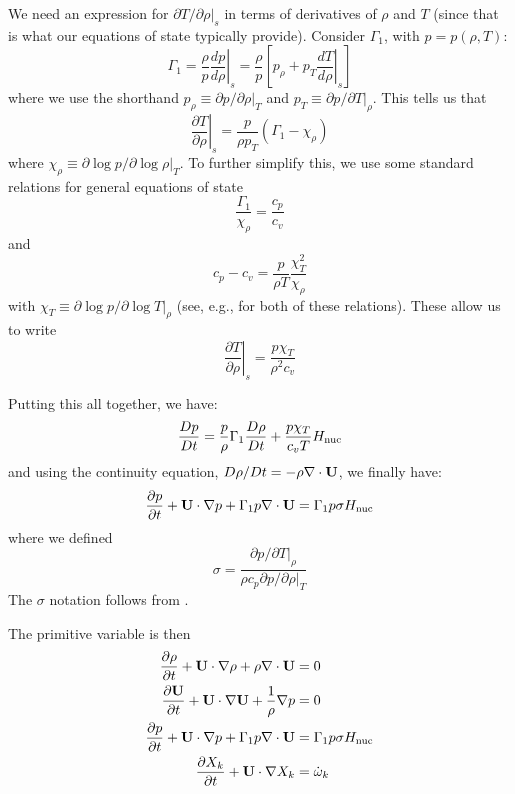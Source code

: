 We need an expression for $\partial T/\partial \rho |_s$ in terms of
derivatives of $\rho$ and $T$ (since that is what our equations of
state typically provide).  Consider $\Gamma_1$, with $p = p(\rho, T)$:
\begin{equation}
  \Gamma_1 = \frac{\rho}{p} \left . \frac{dp}{d\rho} \right |_s
  = \frac{\rho}{p} \left [ p_\rho + p_T \left . \frac{dT}{d\rho} \right |_s \right ]
\end{equation}
where we use the shorthand $p_\rho \equiv \partial p/\partial \rho |_T$ and
$p_T \equiv \partial p/\partial T |_\rho$.  This tells us that
\begin{equation}
  \left . \frac{\partial T}{\partial \rho} \right |_s = \frac{p}{\rho p_T} (\Gamma_1 - \chi_\rho)
\end{equation}
where $\chi_\rho \equiv \partial \log p / \partial \log \rho |_T$.  To further simplify this,
we use some standard relations for general equations of state
\begin{equation}
\frac{\Gamma_1}{\chi_\rho} = \frac{c_p}{c_v}
\end{equation}
and
\begin{equation}
  c_p - c_v = \frac{p}{\rho T} \frac{\chi_T^2}{\chi_\rho}
\end{equation}
with $\chi_T \equiv \partial \log p / \partial \log T |_\rho$
(see, e.g., \cite{HKT} for both of these relations).  These allow us to write
\begin{equation}
  \left . \frac{\partial T}{\partial \rho} \right |_s = \frac{p\chi_T}{\rho^2 c_v}
\end{equation}

Putting this all together, we have:
\begin{equation}
\frac{Dp}{Dt} = \frac{p}{\rho}\Gamma_1  \frac{D\rho}{Dt}
   + \frac{p \chi_T}{c_v T} {H_\mathrm{nuc}}
\end{equation}
and using the continuity equation, $D\rho/Dt = -\rho \nabla \cdot {\bf U}$, 
we finally have:
\begin{equation}
\label{eq:reacting:p}
{\frac{{\partial p}}{\partial t}} + {\bf U} \cdot \nabla p + \Gamma_1 p \nabla \cdot {\bf U} = \Gamma_1 p \sigma {H_\mathrm{nuc}}
\end{equation}
where we defined
\begin{equation}
\sigma = \frac{\partial p/\partial T |_\rho}{\rho c_p \partial p/\partial \rho |_T}
\end{equation}
The $\sigma$ notation follows from \cite{ABRZ:II}.

The primitive variable is then
\begin{align}
{\frac{{\partial\rho}}{\partial t}} + {\bf U} \cdot \nabla \rho + \rho \nabla \cdot {\bf U} &= 0\\
{\frac{{\partial{\bf U}}}{\partial t}} + {\bf U} \cdot\nabla {\bf U} + \frac{1}{\rho} \nabla p &= 0\\
{\frac{{\partial p}}{\partial t}} + {\bf U} \cdot \nabla p + \Gamma_1 p \nabla \cdot {\bf U} &= \Gamma_1 p \sigma {H_\mathrm{nuc}} \\
{\frac{{\partial X_k}}{\partial t}} + {\bf U} \cdot \nabla {X_k} &= {\dot{\omega}}_k 
\end{align}


